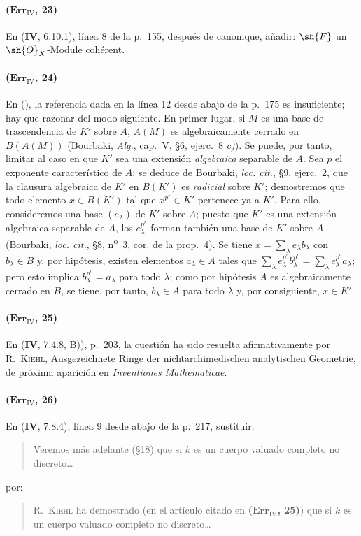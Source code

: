 \paragraph{($\mathbf{Err}_{\mathrm{IV}}$, 23)}
En (\textbf{IV}, 6.10.1), línea 8 de la p.~155, después de canonique, añadir:
$\sh{F}$ un $\sh{O}_X$-Module cohérent.

\paragraph{($\mathbf{Err}_{\mathrm{IV}}$, 24)}
En ({}), la referencia
dada en la línea 12 desde abajo de la p.~175 es insuficiente; hay que razonar
del modo siguiente. En primer lugar, si $M$ es una base de trascendencia
de $K'$ sobre $A$, $A(M)$ es algebraicamente cerrado en $B(A(M))$
(Bourbaki, \emph{Alg.}, cap.~V, \S6, ejerc.~8 \emph{c)}). Se puede, por tanto,
limitar al caso en que $K'$ sea una extensión \emph{algebraica} separable de $A$.
Sea $p$ el exponente característico de $A$; se deduce de Bourbaki,
\emph{loc. cit.}, \S9, ejerc.~2, que la clausura algebraica de $K'$
en $B(K')$ es \emph{radicial} sobre $K'$; demostremos que todo elemento
$x\in B(K')$ tal que $x^{p^r}\in K'$ pertenece ya a $K'$. Para ello,
consideremos una base $(e_\lambda)$ de $K'$ sobre $A$; puesto que $K'$ es una
extensión algebraica separable de $A$, los $e_\lambda^{p^r}$ forman
también una base de $K'$ sobre $A$ (Bourbaki, \emph{loc. cit.}, \S8,
n\textsuperscript{o}~3, cor. de la prop.~4). Se tiene
$x=\sum_\lambda e_\lambda b_\lambda$ con $b_\lambda\in B$ y, por
hipótesis, existen elementos $a_\lambda\in A$ tales que
$\sum_\lambda e_\lambda^{p^r}b_\lambda^{p^r}=\sum_\lambda e_\lambda^{p^r}a_\lambda$;
pero esto implica $b_\lambda^{p^r}=a_\lambda$ para todo $\lambda$;
como por hipótesis $A$ es algebraicamente cerrado en $B$, se tiene, por tanto,
$b_\lambda\in A$ para todo $\lambda$ y, por consiguiente, $x\in K'$.

\paragraph{($\mathbf{Err}_{\mathrm{IV}}$, 25)}
En (\textbf{IV}, 7.4.8, B)), p.~203, la cuestión ha sido resuelta afirmativamente
por R.~\textsc{Kiehl}, Ausgezeichnete Ringe der nichtarchimedischen
analytischen Geometrie, de próxima aparición en \emph{Inventiones
Mathematicae}.

\paragraph{($\mathbf{Err}_{\mathrm{IV}}$, 26)}
En (\textbf{IV}, 7.8.4), línea 9 desde abajo de la p.~217, sustituir:
\begin{quote}
Veremos más adelante (\S18) que si $k$ es un cuerpo valuado completo no
discreto\ldots
\end{quote}
por:
\begin{quote}
R.~\textsc{Kiehl} ha demostrado (en el artículo citado en
\textbf{($\mathbf{Err}_{\mathrm{IV}}$, 25)}) que si $k$ es un cuerpo valuado completo no
discreto\ldots
\end{quote}


